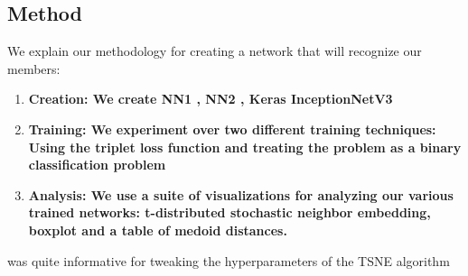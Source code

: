 \subsection{Method}

We explain our methodology for creating a network that will recognize our members:
\begin{enumerate}
    \item \bf{Creation}: We create NN1 \cite[Table 1]{facenet}, NN2 \cite[Table 2]{facenet}, Keras InceptionNetV3
    \item \bf{Training}: We experiment over two different training techniques: Using the triplet loss function and treating the problem as a binary classification problem \cite{deepface}
    \item \bf{Analysis}: We use a suite of visualizations for analyzing our various trained networks: t-distributed stochastic neighbor embedding, boxplot and a table of medoid distances. 
\end{enumerate}

\cite{tsne_how_to} was quite informative for tweaking the hyperparameters of the TSNE algorithm 